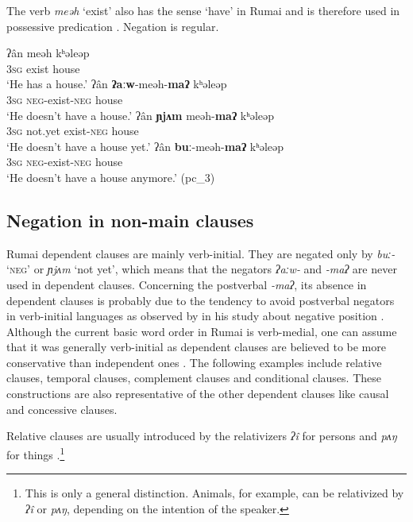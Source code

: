 \documentclass[output=paper,colorlinks,citecolor=brown]{langscibook}
\begin{document}
The verb \textit{meəh} ‘exist’ also has the sense ‘have’ in Rumai and is therefore used in possessive predication . Negation is regular.

\ea\label{ex:rum:44}
    \ea\label{ex:rum:44a}
        \gll ʔân 	meəh	kʰəleəp \\ 
             3\textsc{sg} exist house \\
        \glt ‘He has a house.’
    \ex\label{ex:rum:44b}
        \gll ʔân 	\textbf{ʔaːw}-meəh-\textbf{maʔ}	kʰəleəp \\
             3\textsc{sg} \textsc{neg}{}-exist-\textsc{neg} house \\
        \glt ‘He doesn’t have a house.’
    \ex\label{ex:rum:44c}
        \gll ʔân 	\textbf{ɲjʌm}	meəh-\textbf{maʔ}	kʰəleəp \\
             3\textsc{sg} not.yet exist-\textsc{neg} house \\
        \glt ‘He doesn’t have a house yet.’
    \ex\label{ex:rum:44d}
        \gll ʔân 	\textbf{buː}-meəh-\textbf{maʔ}	kʰəleəp \\
             3\textsc{sg} \textsc{neg}{}-exist-\textsc{neg} house \\
        \glt ‘He doesn’t have a house anymore.’ (pc\_3)
    \z
\z 

\subsection{Negation in non-main clauses} \label{sec:rum:2.4}

Rumai dependent clauses are mainly verb-initial. They are negated only by \textit{buː{}-} ‘\textsc{neg}’ or \textit{ɲjʌm} ‘not yet’, which means that the negators \textit{ʔaːw-} and \textit{{}-maʔ} are never used in dependent clauses. Concerning the postverbal \textit{{}-maʔ}, its absence in dependent clauses is probably due to the tendency to avoid postverbal negators in verb-initial languages as observed by \citet{Dryer1988} in his study about negative position \citep[97]{Dryer1988}. Although the current basic word order in Rumai is verb-medial, one can assume that it was generally verb-initial as dependent clauses are believed to be more conservative than independent ones \citep{Bybee2001}.
The following examples include relative clauses, temporal clauses, complement clauses and conditional clauses. These constructions are also representative of the other dependent clauses like causal and concessive clauses.

Relative clauses are usually introduced by the relativizers \textit{ʔî} for persons  and \textit{pʌŋ} for things .\footnote{This is only a general distinction. Animals, for example, can be relativized by \textit{ʔî} or \textit{pʌŋ}, depending on the intention of the speaker.}
\end{document}
